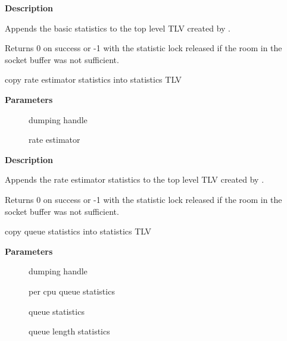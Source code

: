 \documentclass[a4paper,8pt,english]{sphinxmanual}
\begin{document}
\textbf{Description}

Appends the basic statistics to the top level TLV created by
{\hyperref[networking/kapi:c.gnet_stats_start_copy]{\emph{}}}.

Returns 0 on success or -1 with the statistic lock released
if the room in the socket buffer was not sufficient.

\begin{fulllineitems}
\label{networking/kapi:c.gnet_stats_copy_rate_est}
copy rate estimator statistics into statistics TLV

\end{fulllineitems}


\textbf{Parameters}
\begin{description}
\item[{}] \leavevmode
dumping handle

\item[{}] \leavevmode
rate estimator

\end{description}

\textbf{Description}

Appends the rate estimator statistics to the top level TLV created by
{\hyperref[networking/kapi:c.gnet_stats_start_copy]{\emph{}}}.

Returns 0 on success or -1 with the statistic lock released
if the room in the socket buffer was not sufficient.

\begin{fulllineitems}
\label{networking/kapi:c.gnet_stats_copy_queue}
copy queue statistics into statistics TLV

\end{fulllineitems}


\textbf{Parameters}
\begin{description}
\item[{}] \leavevmode
dumping handle

\item[{}] \leavevmode
per cpu queue statistics

\item[{}] \leavevmode
queue statistics

\item[{}] \leavevmode
queue length statistics

\end{description}
\end{document}
